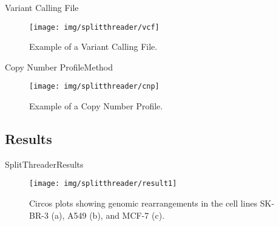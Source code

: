 \documentclass[10pt]{beamer}
\newcommand{\1}{
	\setbeamertemplate{background}{
		\texttt{[image: img/1]}
		\tikz[overlay] \fill[fill opacity=0.75,fill=white] (0,0) rectangle (-\paperwidth,\paperheight);
	}
}
\begin{document}
\begin{frame}{Variant Calling File}{}	
	\begin{figure}[h]
		\centering
		\texttt{[image: img/splitthreader/vcf]}
		\caption{Example of a Variant Calling File.}
	\end{figure}
\end{frame}

\begin{frame}{Copy Number Profile}{Method}	
	\begin{figure}[h]
		\centering
		\texttt{[image: img/splitthreader/cnp]}
		\caption{Example of a Copy Number Profile.}
	\end{figure}
\end{frame}



\subsection{Results}

\begin{frame}{SplitThreader}{Results}	
	\begin{figure}
		\centering
		\texttt{[image: img/splitthreader/result1]}
		\caption{ Circos plots showing genomic rearrangements in the cell lines SK-BR-3 (a), A549 (b), and MCF-7 (c).}
	\end{figure}
\end{frame}
\end{document}
